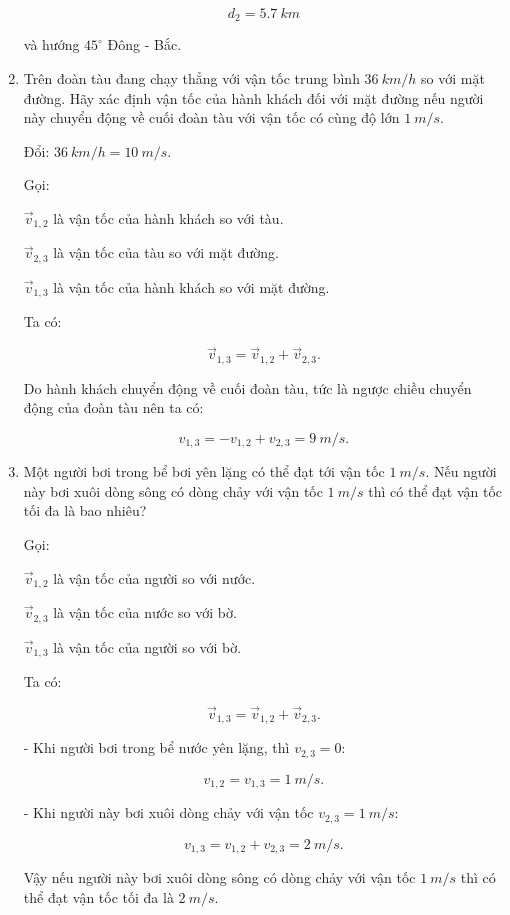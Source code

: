 \begin{enumerate}[label=\bfseries Câu \arabic*:]
{	$$d_2 = \SI{5,7}{km}$$
	
	và hướng $45^\circ$ Đông - Bắc.
}

\item {}


{   
	Trên đoàn tàu đang chạy thẳng với vận tốc trung bình $\SI{36}{km/h}$ so với mặt đường. Hãy xác định vận tốc của hành khách đối với mặt đường nếu người này chuyển động về cuối đoàn tàu với vận tốc có cùng độ lớn $\SI{1}{m/s}$.
}
\hideall
{
	
	Đổi: $\SI{36}{km/h} = \SI{10}{m/s}$.
	
	Gọi:
	
	$\vec v_{1,2}$ là vận tốc của hành khách so với tàu.
	
	$\vec v_{2,3}$ là vận tốc của tàu so với mặt đường.
	
	$\vec v_{1,3}$ là vận tốc của hành khách so với mặt đường.
	
	Ta có:
	
	$$\vec v_{1,3} = \vec v_{1,2} + \vec v_{2,3}.$$
	
	Do hành khách chuyển động về cuối đoàn tàu, tức là ngược chiều chuyển động của đoàn tàu nên ta có:
	
	$$v_{1,3} = - v_{1,2} + v_{2,3} = \SI{9}{m/s}.$$
	
	
}
\item {}


{
	Một người bơi trong bể bơi yên lặng có thể đạt tới vận tốc $\SI{1}{m/s}$. Nếu người này bơi xuôi dòng sông có dòng chảy với vận tốc $\SI{1}{m/s}$ thì có thể đạt vận tốc tối đa là bao nhiêu?
}
\hideall
{
	Gọi:
	
	$\vec v_{1,2}$ là vận tốc của người so với nước.
	
	$\vec v_{2,3}$ là vận tốc của nước so với bờ.
	
	$\vec v_{1,3}$ là vận tốc của người so với bờ.
	
	Ta có:
	
	$$\vec v_{1,3} = \vec v_{1,2} + \vec v_{2,3}.$$
	
	- Khi người bơi trong bể nước yên lặng, thì $v_{2,3} = 0$:
	
	$$v_{1,2} = v_{1,3} = \SI{1}{m/s}.$$
	
	- Khi người này bơi xuôi dòng chảy với vận tốc $v_{2,3} = \SI{1}{m/s}$:
	
	
	$$v_{1,3} = v_{1,2} + v_{2,3} = \SI{2}{m/s}.$$
	
	Vậy nếu người này bơi xuôi dòng sông có dòng chảy với vận tốc $\SI{1}{m/s}$ thì có thể đạt vận tốc tối đa là $\SI{2}{m/s}.$
	
}
\end{enumerate}
